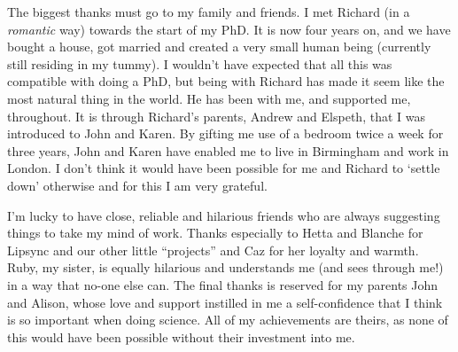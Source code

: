 The biggest thanks must go to my family and friends. I met Richard (in a \textit{romantic} way) towards the start of my PhD. It is now four years on, and we have bought a house, got married and created a very small human being (currently still residing in my tummy). I wouldn't have expected that all this was compatible with doing a PhD, but being with Richard has made it seem like the most natural thing in the world. He has been with me, and supported me, throughout. It is through Richard's parents, Andrew and Elspeth, that I was introduced to John and Karen. By gifting me use of a bedroom twice a week for three years, John and Karen have enabled me to live in Birmingham and work in London. I don't think it would have been possible for me and Richard to `settle down' otherwise and for this I am very grateful.

I'm lucky to have close, reliable and hilarious friends who are always suggesting things to take my mind of work. Thanks especially to Hetta and Blanche for Lipsync and our other little ``projects'' and Caz for her loyalty and warmth. Ruby, my sister, is equally hilarious and understands me (and sees through me!) in a way that no-one else can. The final thanks is reserved for my parents John and Alison, whose love and support instilled in me a self-confidence that I think is so important when doing science. All of my achievements are theirs, as none of this would have been possible without their investment into me.